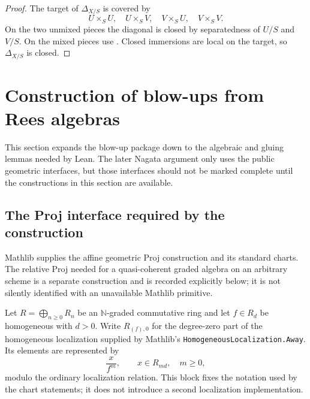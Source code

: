 \begin{proof}
  The target of $\Delta_{X/S}$ is covered by
  \[
    U\times_SU,\quad U\times_SV,\quad
    V\times_SU,\quad V\times_SV.
  \]
  On the two unmixed pieces the diagonal is closed by separatedness of $U/S$
  and $V/S$.  On the mixed pieces use
  .  Closed immersions are local on the
  target, so $\Delta_{X/S}$ is closed.
\end{proof}

\section{Construction of blow-ups from Rees algebras}
\label{sec:nagata-blowup-foundations}

This section expands the blow-up package down to the algebraic and gluing
lemmas needed by Lean.  The later Nagata argument only uses the public
geometric interfaces, but those interfaces should not be marked complete until
the constructions in this section are available.

\subsection{The Proj interface required by the construction}

Mathlib supplies the affine geometric Proj construction and its standard
charts.  The relative Proj needed for a quasi-coherent graded algebra on an
arbitrary scheme is a separate construction and is recorded explicitly below;
it is not silently identified with an unavailable Mathlib primitive.

\begin{definition}
  \label{def:nagata-homogeneous-localization-degree-zero}

  Let $R=\bigoplus_{n\geq0}R_n$ be an $\mathbb N$-graded commutative ring and
  let $f\in R_d$ be homogeneous with $d>0$.  Write $R_{(f),0}$ for the
  degree-zero part of the homogeneous localization supplied by Mathlib's
  \texttt{HomogeneousLocalization.Away}.  Its elements are represented by
  \[
    \frac{x}{f^m},\qquad x\in R_{md},\quad m\geq0,
  \]
  modulo the ordinary localization relation.  This block fixes the notation
  used by the chart statements; it does not introduce a second localization
  implementation.
\end{definition}

